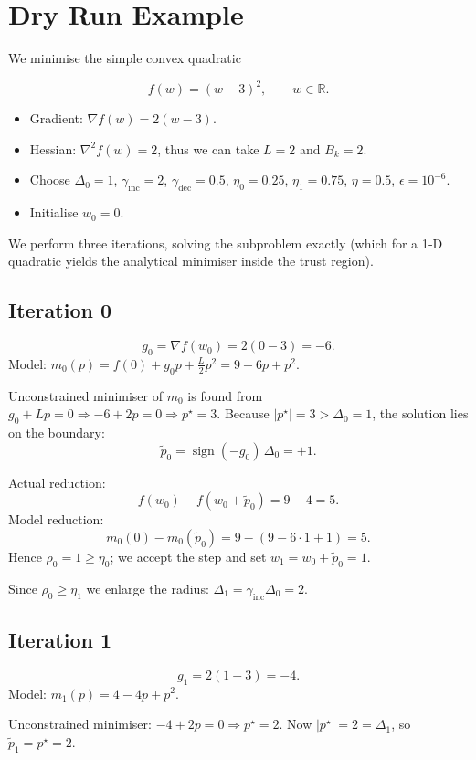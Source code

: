 \documentclass[11pt]{article}
\begin{document}
\section{Dry Run Example}
We minimise the simple convex quadratic  

\[
f(w) = (w-3)^2, \qquad w\in\mathbb{R}.
\]

\begin{itemize}
\item Gradient: \(\nabla f(w)=2(w-3)\).
\item Hessian: \(\nabla^2 f(w)=2\), thus we can take \(L=2\) and \(B_k = 2\).
\item Choose \(\Delta_0=1\), \(\gamma_{\mathrm{inc}}=2\), \(\gamma_{\mathrm{dec}}=0.5\), 
\(\eta_0=0.25\), \(\eta_1=0.75\), \(\eta=0.5\), \(\epsilon=10^{-6}\).
\item Initialise \(w_0=0\).
\end{itemize}

We perform three iterations, solving the subproblem exactly (which for a 1‑D quadratic yields the analytical minimiser inside the trust region).

\subsection*{Iteration 0}
\[
g_0 = \nabla f(w_0)=2(0-3)=-6.
\]
Model: \(m_0(p)=f(0)+g_0 p + \frac{L}{2}p^2 = 9 -6p + p^2\).

Unconstrained minimiser of \(m_0\) is found from \(g_0+L p=0\Rightarrow -6+2p=0\Rightarrow p^{\star}=3\).
Because \(|p^{\star}|=3 >\Delta_0=1\), the solution lies on the boundary:
\[
\tilde p_0 = \operatorname{sign}(-g_0)\,\Delta_0 = +1 .
\]

Actual reduction:
\[
f(w_0)-f(w_0+\tilde p_0)=9-4=5.
\]
Model reduction:
\[
m_0(0)-m_0(\tilde p_0)=9-(9-6\cdot1+1)=5.
\]
Hence \(\rho_0=1\ge\eta_0\); we accept the step and set \(w_1=w_0+\tilde p_0=1\).

Since \(\rho_0\ge\eta_1\) we enlarge the radius: \(\Delta_1=\gamma_{\mathrm{inc}}\Delta_0=2\).

\subsection*{Iteration 1}
\[
g_1 = 2(1-3)=-4.
\]
Model: \(m_1(p)=4 -4p + p^2\).

Unconstrained minimiser: \(-4+2p=0\Rightarrow p^{\star}=2\).  
Now \(|p^{\star}|=2 =\Delta_1\), so \(\tilde p_1=p^{\star}=2\).
\end{document}
